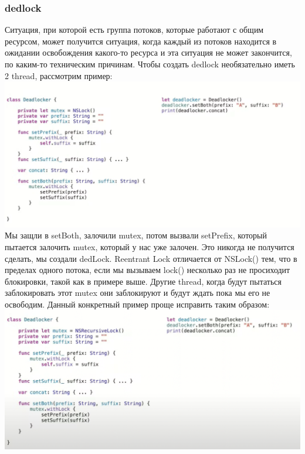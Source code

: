 \documentclass{article}
\begin{document}
    \subsubsection{dedlock}
    Ситуация, при которой есть группа потоков, которые работают с общим ресурсом, может получится ситуация, когда каждый из потоков находится в ожидании освобождения какого-то ресурса и эта ситуация не может закончится, по каким-то техническим причинам. Чтобы создать dedlock необязательно иметь 2 thread, рассмотрим пример:  
    \newline
    \includegraphics[scale = 0.5]{pic/Снимок экрана 2023-08-04 в 12.20.25.png}
    \newline
    Мы защли в setBoth, залочили mutex, потом вызвали setPrefix, который пытается залочить mutex, который у нас уже залочен. Это никогда не получится сделать, мы создали dedLock.
    \newline
    Reentrant Lock отличается от NSLock() тем, что в пределах одного потока, если мы вызываем lock() несколько раз не просиходит блокировки, такой как в примере выше. Другие thread, когда будут пытаться заблокировать этот mutex они заблокируют и будут ждать пока мы его не освободим. Данный конкретный пример проще исправить таким образом: 
    \newline
    \includegraphics[scale = 0.5]{pic/Снимок экрана 2023-08-04 в 12.23.50.png}
\end{document}
